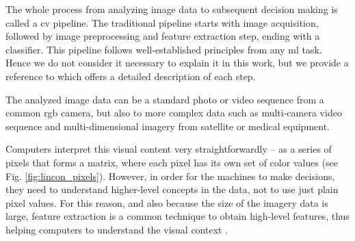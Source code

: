         The whole process from analyzing image data to subsequent decision making is called a \gls{cv} pipeline. The traditional pipeline starts with image acquisition, followed by image preprocessing and feature extraction step, ending with a classifier. This pipeline follows well-established principles from any \gls{ml} task. Hence we do not consider it necessary to explain it in this work, but we provide a reference to \cite{koenpieline} which offers a detailed description of each step.
    
        The analyzed image data can be a standard photo or video sequence from a common \gls{rgb} camera, but also to more complex data such as multi-camera video sequence and multi-dimensional imagery from satellite or medical equipment. 
        
        Computers interpret this visual content very straightforwardly -- as a series of pixels that forms a matrix, where each pixel has its own set of color values (see Fig. \ref{fig:lincon_pixels}). However, in order for the machines to make decisions, they need to understand higher-level concepts in the data, not to use just plain pixel values. For this reason, and also because the size of the imagery data is large, feature extraction is a common technique to obtain high-level features, thus helping computers to understand the visual context \cite{computervisiongolan}. 
        
